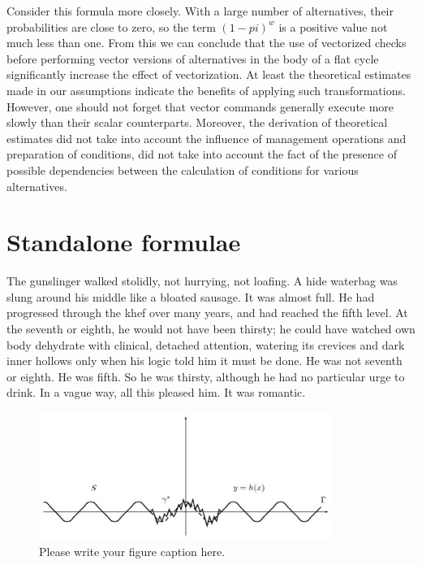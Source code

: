 \documentclass[
11pt,%
tightenlines,%
twoside,%
onecolumn,%
nofloats,%
nobibnotes,%
nofootinbib,%
superscriptaddress,%
noshowpacs,%
centertags]%
{revtex4}
\begin{document}
Consider this formula more closely. With a large number of alternatives, their probabilities are close to zero, so the term $(1 - pi) ^ w$ is a positive value not much less than one. From this we can conclude that the use of vectorized checks before performing vector versions of alternatives in the body of a flat cycle significantly increase the effect of vectorization. At least the theoretical estimates made in our assumptions indicate the benefits of applying such transformations. However, one should not forget that vector commands generally execute more slowly than their scalar counterparts. Moreover, the derivation of theoretical estimates did not take into account the influence of management operations and preparation of conditions, did not take into account the fact of the presence of possible dependencies between the calculation of conditions for various alternatives.

\section{Standalone formulae}

The gunslinger walked stolidly, not hurrying, not loafing. A hide waterbag was slung around his middle like a bloated sausage. It was almost full. He had progressed through the khef over many years, and had reached the fifth level. At the seventh or eighth, he would not have been thirsty; he could have watched own body dehydrate with clinical, detached attention, watering its crevices and dark inner hollows only when his logic told him it must be done. He was not seventh or eighth. He was fifth. So he was thirsty, although he had no particular urge to drink. In a vague way, all this pleased him. It was romantic.

\begin{figure}[h]
\setcaptionmargin{5mm}
\onelinecaptionstrue  %
\includegraphics[width=0.85\textwidth]{deform.eps}
\caption{Please write your figure caption here.}\label{fig:1}
\end{figure}
\end{document}
